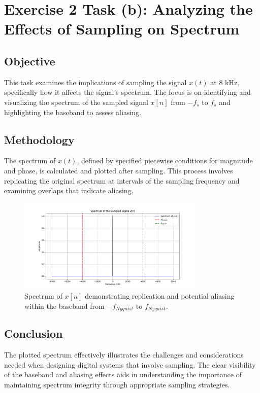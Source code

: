 \item[(b)]
\section*{Exercise 2 Task (b): Analyzing the Effects of Sampling on Spectrum}

\subsection*{Objective}
This task examines the implications of sampling the signal \(x(t)\) at 8 kHz, specifically how it affects the signal's spectrum. The focus is on identifying and visualizing the spectrum of the sampled signal \(x[n]\) from \(-f_s\) to \(f_s\) and highlighting the baseband to assess aliasing.

\subsection*{Methodology}
The spectrum of \(x(t)\), defined by specified piecewise conditions for magnitude and phase, is calculated and plotted after sampling. This process involves replicating the original spectrum at intervals of the sampling frequency and examining overlaps that indicate aliasing.

\begin{figure}[h]
    \centering
    \includegraphics[width=0.8\textwidth]{fig/ex2_task_b_spectrum.png}
    \caption{Spectrum of \(x[n]\) demonstrating replication and potential aliasing within the baseband from \(-f_{Nyquist}\) to \(f_{Nyquist}\).}
    \label{fig:exercise2b_spectrum}
\end{figure}

\subsection*{Conclusion}
The plotted spectrum effectively illustrates the challenges and considerations needed when designing digital systems that involve sampling. The clear visibility of the baseband and aliasing effects aids in understanding the importance of maintaining spectrum integrity through appropriate sampling strategies.
